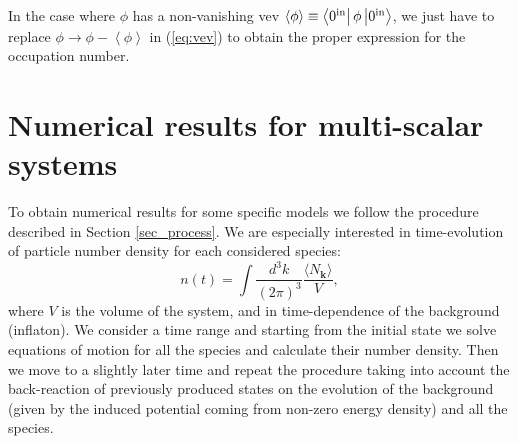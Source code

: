 \documentclass[twocolumn,showpacs,preprintnumbers,amsmath,amssymb,nofootinbib,superscriptaddress,prc]{revtex4}
\begin{document}
In the case where $\phi$ has a non-vanishing vev $\left<\phi\right>\equiv\left<0^{\rm in}\right|\phi\left|0^{\rm in}\right>$, we just have to replace $\phi \rightarrow \phi - \left<\phi\right>$ in (\ref{eq:vev}) to obtain the proper expression for the occupation number.


\section{Numerical results for multi-scalar systems \label{sec_ex2}}

To obtain numerical results for some specific models we follow the procedure described in Section \ref{sec_process}. We are especially interested in time-evolution of particle number density for each considered species:
\begin{equation}
n(t) = \int \frac{d^3 k}{(2 \pi)^3} \frac{\langle N_{\mathbf{k}} \rangle}{V},
\end{equation}
where $V$ is the volume of the system, and in time-dependence of the background (inflaton). We consider a time range and starting from the initial state we solve equations of motion for all the species and calculate their number density. Then we move to a slightly later time and repeat the procedure taking into account the back-reaction of previously produced states on the evolution of the background (given by the induced potential coming from non-zero energy density) and all the species.
\end{document}
